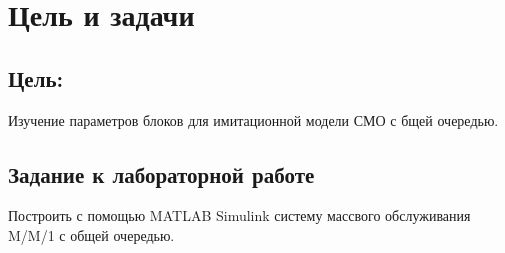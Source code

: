 \chapter{Цель и задачи}
\label{ch:intro}

\section*{\textbf{Цель:}} 

Изучение параметров блоков для имитационной модели
СМО с бщей очередью.

\section*{Задание к лабораторной работе}

Построить с помощью MATLAB Simulink систему массвого обслуживания M/M/1 с общей очередью.


\endinput